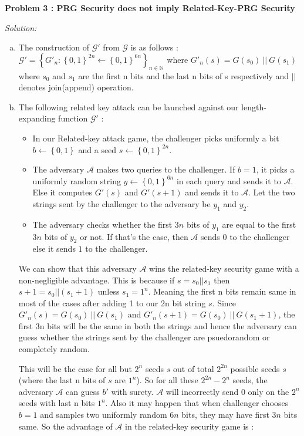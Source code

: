 \documentclass[a4paper, 11pt]{article}
\newenvironment{solution}
    {\textit{Solution:}}
    {\clearpage}
\newcommand{\prob}[1]{\begin{mdframed}[backgroundcolor=gray!20] \textbf{Problem #1}\end{mdframed}}
\newcommand{\bit}{\left\{0, 1\right\}}
\newcommand{\N}{\mathbb{N}}
\newcommand{\calA}{\mathcal{A}}
\newcommand{\calG}{\mathcal{G}}
\begin{document}
\prob{3 : PRG Security does not imply Related-Key-PRG Security}
\begin{solution}
    \begin{enumerate}[(a)]
        \item The construction of $\calG'$ from $\calG$ is as follows :\\ 
        $\calG' = \left\{ G'_n : \bit^{2n} \gets \bit^{6n} \right\}_{n \in \N }$ where $G'_n(s) = G(s_0) \:||\: G(s_1)$ where $s_0$ and $s_1$ are the first n bits and the last n bits of s respectively and $||$ denotes join(append) operation.

        \item The following related key attack can be launched against our length-expanding function $\calG'$ :
        \begin{itemize}
            \item In our Related-key attack game, the challenger picks uniformly a bit $b \gets \bit$ and a seed $s \gets \bit^{2n}$.
            \item The adversary $\calA$ makes two queries to the challenger. If $b = 1$, it picks a uniformly random string $y \gets \bit^{6n}$ in each query and sends it to $\calA$. Else it computes $G'(s)$ and $G'(s+1)$ and sends it to $\calA$. Let the two strings sent by the challenger to the adversary be $y_1$ and $y_2$.
            \item The adversary checks whether the first $3n$ bits of $y_1$ are equal to the first $3n$ bits of $y_2$ or not. If that's the case, then $\calA$ sends $0$ to the challenger else it sends $1$ to the challenger.
        \end{itemize}
        We can show that this adversary $\calA$ wins the related-key security game with a non-negligible advantage. This is because if $s = s_0 || s_1$ then $s+1 = s_0 || (s_1+1)$ unless $s_1 = 1^n$. Meaning the first n bits remain same in most of the cases after adding 1 to our 2n bit string $s$. Since $G'_n(s) = G(s_0) \:||\: G(s_1)$ and $G'_n(s+1) = G(s_0) \:||\: G(s_1+1)$, the first 3n bits will be the same in both the strings and hence the adversary can guess whether the strings sent by the challenger are psuedorandom or completely random.

        This will be the case for all but $2^n$ seeds $s$ out of total $2^{2n}$ possible seeds $s$ (where the last n bits of $s$ are $1^n$). So for all these $2^{2n} - 2^n$ seeds, the adversary $\calA$ can guess $b'$ with surety. $\calA$ will incorrectly send $0$ only on the $2^n$ seeds with last n bits $1^n$. Also it may happen that when challenger chooses $b=1$ and samples two uniformly random $6n$ bits, they may have first $3n$ bits same. So the advantage of $\calA$ in the related-key security game is :


\end{enumerate}
\end{solution}
\end{document}
